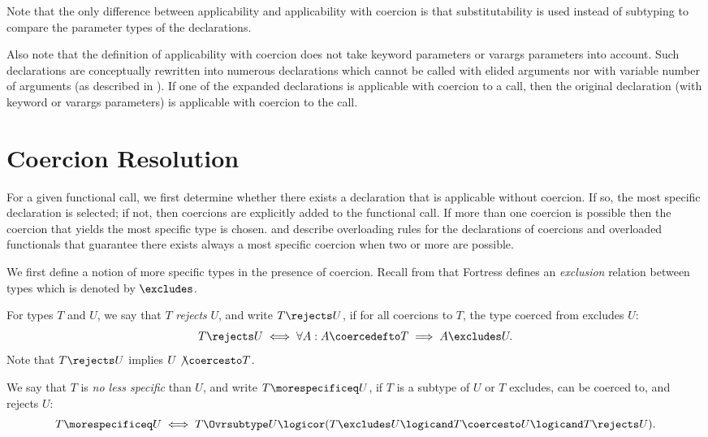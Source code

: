 Note that the only difference between applicability and applicability
with coercion is that substitutability is used instead of subtyping
to compare the parameter types of the declarations.

Also note that the definition of applicability with coercion does not
take keyword parameters or varargs parameters into account.  Such
declarations are conceptually rewritten into numerous declarations
which cannot be called with elided arguments nor with variable number of
arguments (as described in ).  If
one of the expanded declarations is applicable with coercion to a call,
then the original declaration (with keyword or varargs parameters) is
applicable with coercion to the call.



\section{Coercion Resolution}
For a given functional call, we first determine whether there exists a
declaration that is applicable without coercion.  If so, the most
specific declaration is selected; if not, then coercions are
explicitly added to the functional call.  If more than one coercion is
possible then the coercion that yields the most specific type is
chosen.   and
 describe overloading rules for the
declarations of coercions and overloaded functionals that guarantee
there exists always a most specific coercion when two or more are possible.

We first define a notion of more specific types in the presence of coercion.
Recall from  that Fortress defines an
\emph{exclusion} relation between types which is denoted by $\excludes$.

For types $T$ and $U$, we say that $T$ \emph{rejects} $U$,
and write $T \rejects U$, if for all coercions to $T$, the type coerced
from excludes $U$:
\[
T \rejects U \iff \forall A: A \coercedefto T \implies A \excludes U.
\]
Note that $T \rejects U$ implies $U \not\coercesto T$.

We say that $T$ is \emph{no less specific} than $U$, and write $T
\morespecificeq U$, if $T$ is a subtype of $U$ or $T$ excludes, can be
coerced to, and rejects $U$:
\[
T \morespecificeq U \iff
T \Ovrsubtype U \logicor
(T \excludes U \logicand T \coercesto U \logicand T \rejects U).
\]

